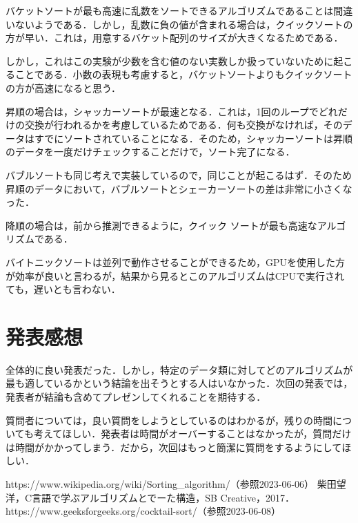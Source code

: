 \documentclass[a4j, titlepage]{jarticle}
\begin{document}
    

    バケットソートが最も高速に乱数をソートできるアルゴリズムであることは間違いないようである．しかし，乱数に負の値が含まれる場合は，クイックソートの方が早い．これは，用意するバケット配列のサイズが大きくなるためである．
    
    しかし，これはこの実験が少数を含む値のない実数しか扱っていないために起こることである．小数の表現も考慮すると，バケットソートよりもクイックソートの方が高速になると思う．
    
    昇順の場合は，シャッカーソートが最速となる．これは，1回のループでどれだけの交換が行われるかを考慮しているためである．何も交換がなければ，そのデータはすでにソートされていることになる．そのため，シャッカーソートは昇順のデータを一度だけチェックすることだけで，ソート完了になる．
    
    バブルソートも同じ考えで実装しているので，同じことが起こるはず．そのため昇順のデータにおいて，バブルソートとシェーカーソートの差は非常に小さくなった．
    
    降順の場合は，前から推測できるように，クイック ソートが最も高速なアルゴリズムである．

    バイトニックソートは並列で動作させることができるため，GPUを使用した方が効率が良いと言わるが，結果から見るとこのアルゴリズムはCPUで実行されても，遅いとも言わない．

    \section{発表感想}
    全体的に良い発表だった．しかし，特定のデータ類に対してどのアルゴリズムが最も適しているかという結論を出そうとする人はいなかった．次回の発表では，発表者が結論も含めてプレゼンしてくれることを期待する． 
    
    質問者については，良い質問をしようとしているのはわかるが，残りの時間についても考えてほしい．発表者は時間がオーバーすることはなかったが，質問だけは時間がかかってしまう．だから，次回はもっと簡潔に質問をするようにしてほしい．

    \begin{thebibliography}{99}
        https://www.wikipedia.org/wiki/Sorting\_algorithm/（参照2023-06-06）
        柴田望洋，C言語で学ぶアルゴリズムとでーた構造，SB Creative，2017．
        https://www.geeksforgeeks.org/cocktail-sort/（参照2023-06-08）
      \end{thebibliography}
\end{document}
